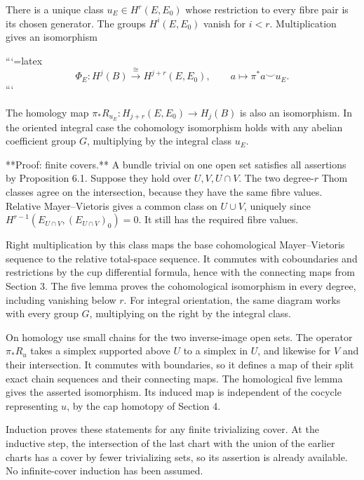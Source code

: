 \begin{theorem}
There is a unique class \(u_E\in H^r(E,E_0)\) whose restriction to every fibre pair is its chosen generator. The groups \(H^i(E,E_0)\) vanish for \(i<r\). Multiplication gives an isomorphism



```{=latex}
\[
\Phi_E:H^j(B)\xrightarrow{\cong}H^{j+r}(E,E_0),
\qquad a\longmapsto\pi^*a\smile u_E.
\]
```



The homology map \(\pi_*R_{u_E}:H_{j+r}(E,E_0)\to H_j(B)\) is also an isomorphism. In the oriented integral case the cohomology isomorphism holds with any abelian coefficient group \(G\), multiplying by the integral class \(u_E\).

**Proof: finite covers.** A bundle trivial on one open set satisfies all assertions by Proposition 6.1. Suppose they hold over \(U,V,U\cap V\). The two degree-\(r\) Thom classes agree on the intersection, because they have the same fibre values. Relative Mayer–Vietoris gives a common class on \(U\cup V\), uniquely since \(H^{r-1}(E_{U\cap V},(E_{U\cap V})_0)=0\). It still has the required fibre values.

Right multiplication by this class maps the base cohomological Mayer–Vietoris sequence to the relative total-space sequence. It commutes with coboundaries and restrictions by the cup differential formula, hence with the connecting maps from Section 3. The five lemma proves the cohomological isomorphism in every degree, including vanishing below \(r\). For integral orientation, the same diagram works with every group \(G\), multiplying on the right by the integral class.

On homology use small chains for the two inverse-image open sets. The operator \(\pi_*R_u\) takes a simplex supported above \(U\) to a simplex in \(U\), and likewise for \(V\) and their intersection. It commutes with boundaries, so it defines a map of their split exact chain sequences and their connecting maps. The homological five lemma gives the asserted isomorphism. Its induced map is independent of the cocycle representing \(u\), by the cap homotopy of Section 4.

Induction proves these statements for any finite trivializing cover. At the inductive step, the intersection of the last chart with the union of the earlier charts has a cover by fewer trivializing sets, so its assertion is already available. No infinite-cover induction has been assumed.


\end{theorem}
